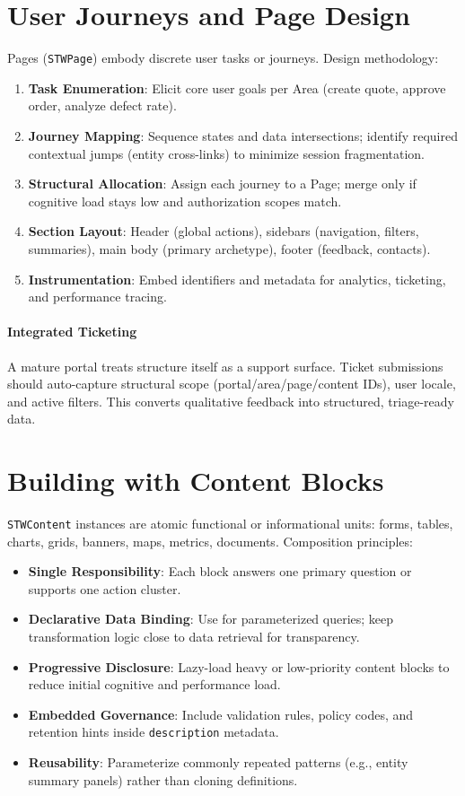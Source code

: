 \section{User Journeys and Page Design}
Pages (\texttt{STWPage}) embody discrete user tasks or journeys. Design methodology:
\begin{enumerate}
	\item \textbf{Task Enumeration}: Elicit core user goals per Area (create quote, approve order, analyze defect rate).
	\item \textbf{Journey Mapping}: Sequence states and data intersections; identify required contextual jumps (entity cross-links) to minimize session fragmentation.
	\item \textbf{Structural Allocation}: Assign each journey to a Page; merge only if cognitive load stays low and authorization scopes match.
	\item \textbf{Section Layout}: Header (global actions), sidebars (navigation, filters, summaries), main body (primary archetype), footer (feedback, contacts).
	\item \textbf{Instrumentation}: Embed identifiers and metadata for analytics, ticketing, and performance tracing.
\end{enumerate}
\paragraph{Integrated Ticketing} A mature portal treats structure itself as a support surface. Ticket submissions should auto-capture structural scope (portal/area/page/content IDs), user locale, and active filters. This converts qualitative feedback into structured, triage-ready data.

\section{Building with Content Blocks}
\texttt{STWContent} instances are atomic functional or informational units: forms, tables, charts, grids, banners, maps, metrics, documents. Composition principles:
\begin{itemize}
	\item \textbf{Single Responsibility}: Each block answers one primary question or supports one action cluster.
	\item \textbf{Declarative Data Binding}: Use \wbpl{} for parameterized queries; keep transformation logic close to data retrieval for transparency.
	\item \textbf{Progressive Disclosure}: Lazy-load heavy or low-priority content blocks to reduce initial cognitive and performance load.
	\item \textbf{Embedded Governance}: Include validation rules, policy codes, and retention hints inside \texttt{description} metadata.
	\item \textbf{Reusability}: Parameterize commonly repeated patterns (e.g., entity summary panels) rather than cloning definitions.
\end{itemize}

